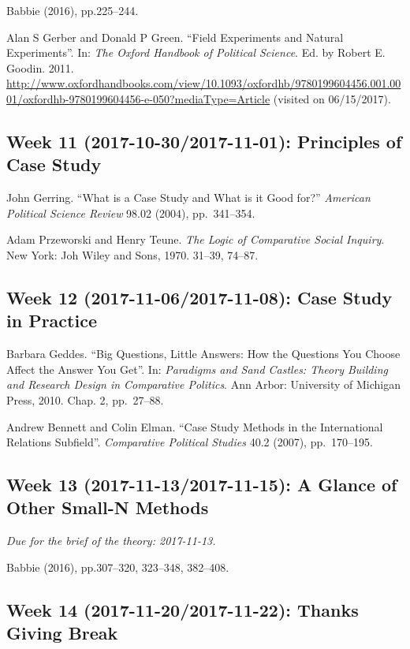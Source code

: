 \documentclass[11pt,]{article}
\theoremstyle{definition}
\theoremstyle{definition}
\theoremstyle{remark}
\begin{document}
Babbie (2016), pp.225--244.

Alan S Gerber and Donald P Green. ``Field Experiments and Natural
Experiments''. In: \emph{The Oxford Handbook of Political Science}. Ed.
by Robert E. Goodin. 2011.
\url{http://www.oxfordhandbooks.com/view/10.1093/oxfordhb/9780199604456.001.0001/oxfordhb-9780199604456-e-050?mediaType=Article}
(visited on 06/15/2017).

\subsection{Week 11 (2017-10-30/2017-11-01): Principles of Case
Study}\label{week-11-2017-10-302017-11-01-principles-of-case-study}

John Gerring. ``What is a Case Study and What is it Good for?''
\emph{American Political Science Review} 98.02 (2004), pp.~341--354.

Adam Przeworski and Henry Teune.
\emph{The Logic of Comparative Social Inquiry}. New York: Joh Wiley and
Sons, 1970. 31--39, 74--87.

\subsection{Week 12 (2017-11-06/2017-11-08): Case Study in
Practice}\label{week-12-2017-11-062017-11-08-case-study-in-practice}

Barbara Geddes. ``Big Questions, Little Answers: How the Questions You
Choose Affect the Answer You Get''. In:
\emph{Paradigms and Sand Castles: Theory Building and Research Design in Comparative Politics}.
Ann Arbor: University of Michigan Press, 2010. Chap. 2, pp.~27--88.

Andrew Bennett and Colin Elman. ``Case Study Methods in the
International Relations Subfield''. \emph{Comparative Political Studies}
40.2 (2007), pp.~170--195.

\subsection{Week 13 (2017-11-13/2017-11-15): A Glance of Other Small-N
Methods}\label{week-13-2017-11-132017-11-15-a-glance-of-other-small-n-methods}

\emph{Due for the brief of the theory: 2017-11-13.}

Babbie (2016), pp.307--320, 323--348, 382--408.

\subsection{Week 14 (2017-11-20/2017-11-22): Thanks Giving
Break}\label{week-14-2017-11-202017-11-22-thanks-giving-break}
\end{document}
